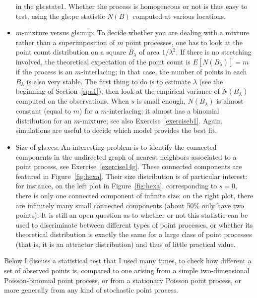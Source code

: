 \documentclass[10pt]{article}
\begin{document}
\begin{itemize}
in the \gls{gls:state1}. Whether the process is homogeneous or not is thus easy to test, using the \gls{gls:pc} statistic
$N(B)$ computed at various locations.
\item \textcolor{index}{$m$-mixture} versus
\gls{gls:mip}: To decide whether you are dealing with a mixture rather than a superimposition of $m$ point processes, one has to look at the point count distribution on a square $B_\lambda$ of area $1/\lambda^2$. If there is no stretching involved, the theoretical expectation of the point count is $E[N(B_\lambda)]=m$ if the process is an $m$-interlacing; in that case, the number of points in each $B_\lambda$ is also very stable. The first thing to do is to estimate $\lambda$ (see the beginning of Section~\ref{spa1}), then look at the empirical variance of $N(B_\lambda)$ computed on the observations. When $s$ is small enough, $N(B_\lambda)$ is almost constant (equal to $m$) for a $m$-interlacing; it almost has a
\textcolor{index}{binomial distribution} for an $m$-mixture; see also Exercise~\ref{exerciseb1}. Again, simulations are useful to decide which model provides the best fit.
\item Size of \glspl{gls:cc}: An interesting problem is to identify the connected components in the
\textcolor{index}{undirected graph} of nearest neighbors associated to a point process, see Exercise~\ref{exercise14g}. These
connected components are featured in Figure~\ref{fig:hexa}. Their size distribution is of particular interest: for instance, on the left plot in  Figure~\ref{fig:hexa},
corresponding to $s=0$, there is only one connected component of infinite size; on the right plot, there are infinitely many small connected components (about 50\% only have two points). It is still an open question as to whether or not this statistic can be used to discriminate between different types of point processes, or whether its theoretical distribution is exactly the same for a large class of point processes (that is, it is an \textcolor{index}{attractor distribution}) and thus of little practical value.
\end{itemize}

\noindent Below I discuss a statistical test that I used many times, to check how different a set of observed points is, compared to one arising from a simple two-dimensional Poisson-binomial point process, or from a stationary Poisson point process, or more generally from any kind of stochastic point process. \\
\end{document}
